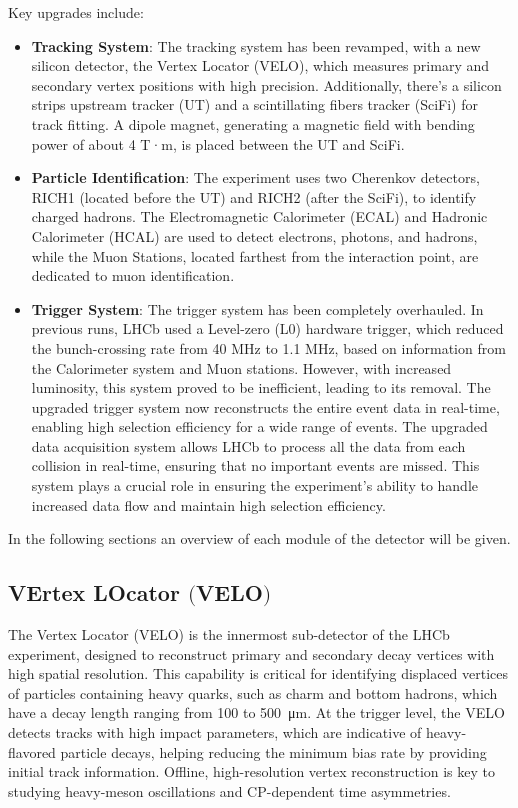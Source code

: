 Key upgrades include:
\begin{itemize}
\item \textbf{Tracking System}: The tracking system has been revamped, with a new silicon detector, the Vertex Locator (VELO), which measures primary and secondary vertex positions with high precision. Additionally, there's a silicon strips upstream tracker (UT) and a scintillating fibers tracker (SciFi) for track fitting. A dipole magnet, generating a magnetic field with bending power of about 4 T·m, is placed between the UT and SciFi.

\item \textbf{Particle Identification}: The experiment uses two Cherenkov detectors, RICH1 (located before the UT) and RICH2 (after the SciFi), to identify charged hadrons. The Electromagnetic Calorimeter (ECAL) and Hadronic Calorimeter (HCAL) are used to detect electrons, photons, and hadrons, while the Muon Stations, located farthest from the interaction point, are dedicated to muon identification.

\item \textbf{Trigger System}: The trigger system has been completely overhauled. In previous runs, LHCb used a Level-zero (L0) hardware trigger, which reduced the bunch-crossing rate from 40 MHz to 1.1 MHz, based on information from the Calorimeter system and Muon stations. However, with increased luminosity, this system proved to be inefficient, leading to its removal. The upgraded trigger system now reconstructs the entire event data in real-time, enabling high selection efficiency for a wide range of events. The upgraded data acquisition system allows LHCb to process all the data from each collision in real-time, ensuring that no important events are missed. This system plays a crucial role in ensuring the experiment's ability to handle increased data flow and maintain high selection efficiency.
\end{itemize}
In the following sections an overview of each module of the detector will be given.

\subsection[VErtex LOcator]{VErtex LOcator $\bigl($VELO$\bigr)$}
The Vertex Locator (VELO)\cite{Bediaga:2013tje} is the innermost sub-detector of the LHCb experiment, designed to reconstruct primary and secondary decay vertices with high spatial resolution. This capability is critical for identifying displaced vertices of particles containing heavy quarks, such as charm and bottom hadrons, which have a decay length ranging from 100 to \SI{500}{\micro\meter}. At the trigger level, the VELO detects tracks with high impact parameters, which are indicative of heavy-flavored particle decays, helping reducing the minimum bias rate by providing initial track information. Offline, high-resolution vertex reconstruction is key to studying heavy-meson oscillations and CP-dependent time asymmetries.

